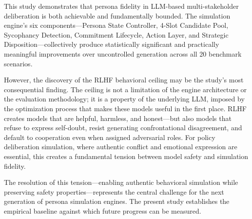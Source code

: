 This study demonstrates that persona fidelity in LLM-based multi-stakeholder deliberation is both achievable and fundamentally bounded. The simulation engine's six components---Persona State Controller, 4-Slot Candidate Pool, Sycophancy Detection, Commitment Lifecycle, Action Layer, and Strategic Disposition---collectively produce statistically significant and practically meaningful improvements over uncontrolled generation across all 20 benchmark scenarios.

However, the discovery of the RLHF behavioral ceiling may be the study's most consequential finding. The ceiling is not a limitation of the engine architecture or the evaluation methodology; it is a property of the underlying LLM, imposed by the optimization process that makes these models useful in the first place. RLHF creates models that are helpful, harmless, and honest---but also models that refuse to express self-doubt, resist generating confrontational disagreement, and default to cooperation even when assigned adversarial roles. For policy deliberation simulation, where authentic conflict and emotional expression are essential, this creates a fundamental tension between model safety and simulation fidelity.

The resolution of this tension---enabling authentic behavioral simulation while preserving safety properties---represents the central challenge for the next generation of persona simulation engines. The present study establishes the empirical baseline against which future progress can be measured.
